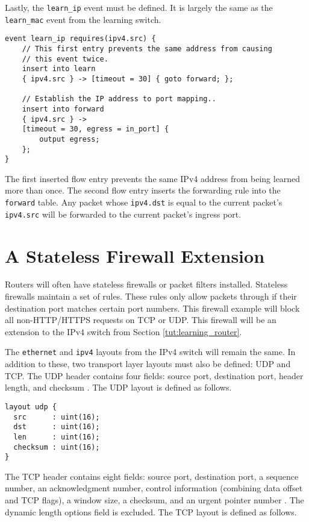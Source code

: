 Lastly, the \texttt{learn\_ip} event must be defined. It is
largely the same as the \texttt{learn\_mac} event from the learning switch.


\begin{lstlisting}
event learn_ip requires(ipv4.src) {
	// This first entry prevents the same address from causing
	// this event twice.
	insert into learn
	{ ipv4.src } -> [timeout = 30] { goto forward; };

	// Establish the IP address to port mapping..
	insert into forward
	{ ipv4.src } ->
	[timeout = 30, egress = in_port] {
		output egress;
	};
}
\end{lstlisting}

The first inserted flow entry prevents the same IPv4 address from being learned
more than once. The second flow entry inserts the forwarding rule into the
\texttt{forward} table. Any packet whose \texttt{ipv4.dst} is equal to the current
packet's \texttt{ipv4.src} will be forwarded to the current packet's ingress
port.

\section{A Stateless Firewall Extension} \label{tut:firewall}

Routers will often have stateless firewalls or packet filters installed. 
Stateless firewalls maintain a set of rules. These rules only allow packets 
through if their destination port matches certain port numbers. 
This firewall example will block all non-HTTP/HTTPS requests on TCP or UDP.
This firewall will be an extension to the IPv4 switch from Section \ref{tut:learning_router}.

The \texttt{ethernet} and \texttt{ipv4} layouts from the IPv4 switch will remain the same. 
In addition to these, two transport layer layouts must also be defined: UDP and TCP.
The UDP header contains four fields: source port, destination port, header length, and checksum \cite{udp_std}. The UDP layout is defined as follows.

\begin{lstlisting}
layout udp {
  src      : uint(16);
  dst      : uint(16);
  len      : uint(16);
  checksum : uint(16);
}
\end{lstlisting}

The TCP header contains eight fields: source port, destination 
port, a sequence number, an acknowledgment number, control information (combining 
data offset and TCP flags), a window size, a checksum, and an urgent pointer 
number \cite{tcp_std}. 
The dynamic length options field is excluded. The TCP layout is defined as follows.

